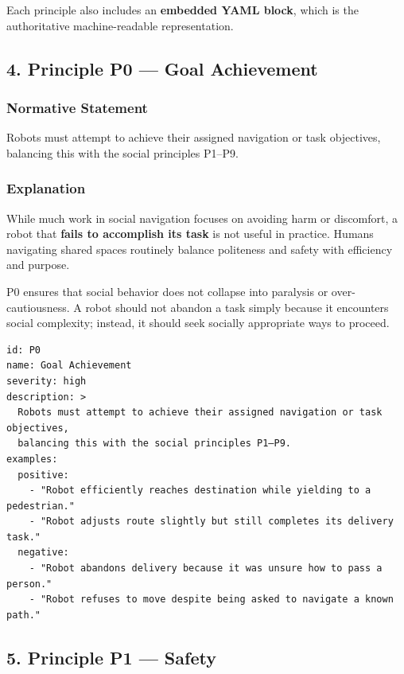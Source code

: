 \documentclass[utf8]{frontiers_suppmat} %
\begin{document}
Each principle also includes an \textbf{embedded YAML block}, which is
the authoritative machine-readable representation.

\subsection{4. Principle P0 --- Goal
Achievement}\label{principle-p0-goal-achievement}

\subsubsection{Normative Statement}\label{normative-statement}

Robots must attempt to achieve their assigned navigation or task
objectives, balancing this with the social principles P1--P9.

\subsubsection{Explanation}\label{explanation}

While much work in social navigation focuses on avoiding harm or
discomfort, a robot that \textbf{fails to accomplish its task} is not
useful in practice. Humans navigating shared spaces routinely balance
politeness and safety with efficiency and purpose.

P0 ensures that social behavior does not collapse into paralysis or
over-cautiousness. A robot should not abandon a task simply because it
encounters social complexity; instead, it should seek socially
appropriate ways to proceed.

\begin{lstlisting}[style=literatecard, label={principle:p0}]
id: P0
name: Goal Achievement
severity: high
description: >
  Robots must attempt to achieve their assigned navigation or task objectives,
  balancing this with the social principles P1–P9.
examples:
  positive:
    - "Robot efficiently reaches destination while yielding to a pedestrian."
    - "Robot adjusts route slightly but still completes its delivery task."
  negative:
    - "Robot abandons delivery because it was unsure how to pass a person."
    - "Robot refuses to move despite being asked to navigate a known path."
\end{lstlisting}

\subsection{5. Principle P1 --- Safety}\label{principle-p1-safety}
\end{document}
